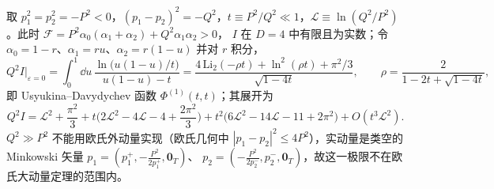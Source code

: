 \begin{example}\label{ex:sudakov-offshell}
取 $p_1^2=p_2^2=-P^2<0$，$(p_1-p_2)^2=-Q^2$，$t\equiv P^2/Q^2\ll1$，$\mathcal L\equiv\ln(Q^2/P^2)$。此时 $\mathcal F=P^2\alpha_0(\alpha_1+\alpha_2)+Q^2\alpha_1\alpha_2>0$，
$I$ 在 $D=4$ 中有限且为实数；令 $\alpha_0=1-r$、$\alpha_1=ru$、$\alpha_2=r(1-u)$ 并对 $r$ 积分，
\begin{equation}\label{eq:sudakov-offshell-exact}
Q^2I\big|_{\varepsilon=0}=\int_0^1\!\dd u\,\frac{\ln\big(u(1-u)/t\big)}{u(1-u)-t}
=\frac{4\,\mathrm{Li}_2(-\rho t)+\ln^2(\rho t)+\pi^2/3}{\sqrt{1-4t}},\qquad\rho=\frac{2}{1-2t+\sqrt{1-4t}},
\end{equation}
即 Usyukina--Davydychev 函数 $\Phi^{(1)}(t,t)$\cite{UsyukinaDavydychev1993a}；其展开为
\begin{equation}\label{eq:sudakov-offshell-nlp}
Q^2I=\mathcal L^2+\frac{\pi^2}3+t\Big(2\mathcal L^2-4\mathcal L-4+\frac{2\pi^2}3\Big)+t^2\big(6\mathcal L^2-14\mathcal L-11+2\pi^2\big)+O(t^3\mathcal L^2).
\end{equation}
$Q^2\gg P^2$ 不能用欧氏外动量实现（欧氏几何中 $|p_1-p_2|^2\le4P^2$），实动量是类空的 Minkowski 矢量 $p_1=(p_1^+,-\frac{P^2}{2p_1^+},\mathbf 0_T)$、
$p_2=(-\frac{P^2}{2p_2^-},p_2^-,\mathbf 0_T)$，故这一极限不在欧氏大动量定理的范围内。


\end{example}
